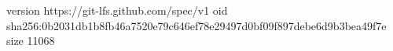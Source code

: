 version https://git-lfs.github.com/spec/v1
oid sha256:0b2031db1b8fb46a7520e79c646ef78e29497d0bf09f897debe6d9b3bea49f7e
size 11068
